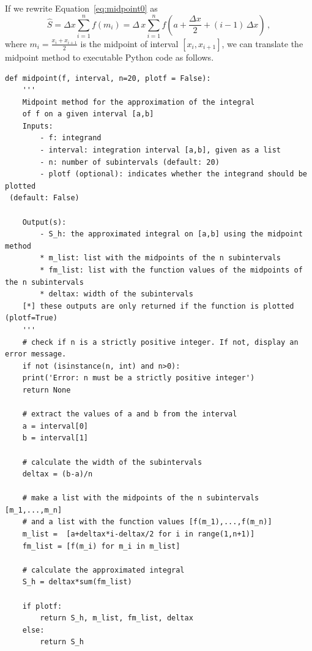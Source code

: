 If we rewrite Equation~\eqref{eq:midpoint0} as
\begin{equation*}\label{eq:midpoint2}
\hat{S} = \Delta x \sum \limits^{n}_{i=1} f\left(m_i\right) = \Delta\,x \sum \limits^{n}_{i=1} f\left(a+\frac{\Delta x}{2}+(i-1)\,\Delta x\right) \, ,
\end{equation*}
where $m_i=\frac{x_i+x_{i+1}}{2}$ is the midpoint of interval $[x_i,x_{i+1}]$, we can translate the midpoint method to executable Python code as follows.

\begin{lstlisting}
def midpoint(f, interval, n=20, plotf = False):
	'''
	Midpoint method for the approximation of the integral
	of f on a given interval [a,b]
	Inputs: 
		- f: integrand
		- interval: integration interval [a,b], given as a list
		- n: number of subintervals (default: 20)
		- plotf (optional): indicates whether the integrand should be plotted
 (default: False)
	
	Output(s):
		- S_h: the approximated integral on [a,b] using the midpoint method
		* m_list: list with the midpoints of the n subintervals
		* fm_list: list with the function values of the midpoints of the n subintervals
		* deltax: width of the subintervals
	[*] these outputs are only returned if the function is plotted (plotf=True)
	'''
    # check if n is a strictly positive integer. If not, display an error message.
	if not (isinstance(n, int) and n>0):
	print('Error: n must be a strictly positive integer')
	return None
	
	# extract the values of a and b from the interval
	a = interval[0]
	b = interval[1]
	
	# calculate the width of the subintervals
	deltax = (b-a)/n
	
	# make a list with the midpoints of the n subintervals [m_1,...,m_n]
	# and a list with the function values [f(m_1),...,f(m_n)]
	m_list =  [a+deltax*i-deltax/2 for i in range(1,n+1)]
	fm_list = [f(m_i) for m_i in m_list]
	
	# calculate the approximated integral
	S_h = deltax*sum(fm_list)
	
	if plotf:
		return S_h, m_list, fm_list, deltax
	else:
		return S_h
\end{lstlisting}


